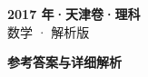 \documentclass[zihao=-4, a4paper]{ctexart}
\begin{document}
\begin{center}
  {\Large\bfseries 2017 年·天津卷·理科}\\[4pt]
  {\large 数学 · 解析版}
\end{center}
\medskip
{}

\clearpage
{}
\begin{center}{\Large\bfseries 参考答案与详细解析}\end{center}
\medskip

\end{document}
